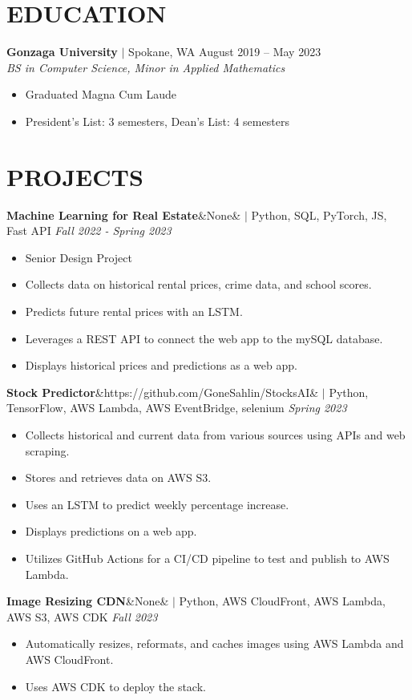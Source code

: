 \documentclass[11pt, a4paper, roman]{moderncv}
\newcommand{\project}[5]{
	\textbf{#1}\ifx\&#2\&{}
	\else
    		\href{#2}{\:\small\faGithub\:}\fi$|$ #3
	\hfill\textit{#4}
	#5
	\vspace{2mm}
}
\newcommand{\education}[5]{
	\textbf{#1} $|$ #2
	\hfill#3
	\\\textit{#4}
	#5
	\vspace{2mm}
}
\begin{document}
\maketitle
\vspace*{-10mm}
\vspace*{-2mm}
\section{EDUCATION}
\education{Gonzaga University}{Spokane, WA}{August 2019 -- May 2023}{BS in Computer Science, Minor in Applied Mathematics}
{\begin{itemize}
\item Graduated Magna Cum Laude
\item President's List: 3 semesters, Dean's List: 4 semesters
\end{itemize}}
\vspace*{-2mm}
\section{PROJECTS}
\project{Machine Learning for Real Estate}{None}{Python, SQL, PyTorch, JS, Fast API}{Fall 2022 - Spring 2023}
{\begin{itemize}
\item Senior Design Project
\item Collects data on historical rental prices, crime data, and school scores.
\item Predicts future rental prices with an LSTM.
\item Leverages a REST API to connect the web app to the mySQL database.
\item Displays historical prices and predictions as a web app.
\end{itemize}}
\project{Stock Predictor}{https://github.com/GoneSahlin/StocksAI}{Python, TensorFlow, AWS Lambda, AWS EventBridge, selenium}{Spring 2023}
{\begin{itemize}
\item Collects historical and current data from various sources using APIs and web scraping.
\item Stores and retrieves data on AWS S3.
\item Uses an LSTM to predict weekly percentage increase.
\item Displays predictions on a web app.
\item Utilizes GitHub Actions for a CI/CD pipeline to test and publish to AWS Lambda.
\end{itemize}}
\project{Image Resizing CDN}{None}{Python, AWS CloudFront, AWS Lambda, AWS S3, AWS CDK}{Fall 2023}
{\begin{itemize}
\item Automatically resizes, reformats, and caches images using AWS Lambda and AWS CloudFront.
\item Uses AWS CDK to deploy the stack.
\end{itemize}}
\vspace*{-2mm}
\end{document}
